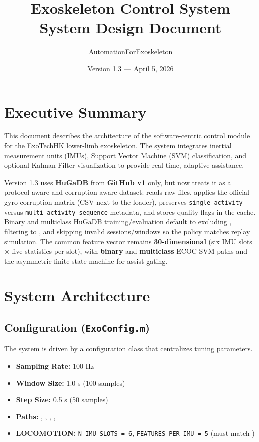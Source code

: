 \documentclass[11pt,a4paper]{article}
\title{Exoskeleton Control System\\[0.35em]\large System Design Document}
\author{AutomationForExoskeleton}
\date{Version 1.3 --- April 5, 2026}
\begin{document}
\maketitle

\section{Executive Summary}
This document describes the architecture of the software-centric control module for the ExoTechHK lower-limb exoskeleton. The system integrates inertial measurement units (IMUs), Support Vector Machine (SVM) classification, and optional Kalman Filter visualization to provide real-time, adaptive assistance.

Version 1.3 uses \textbf{HuGaDB} from \textbf{GitHub v1} only, but now treats it as a protocol-aware and corruption-aware dataset:  reads raw  files, applies the official gyro corruption matrix (CSV next to the loader), preserves \texttt{single\_activity} versus \texttt{multi\_activity\_sequence} metadata, and stores quality flags in the cache. Binary and multiclass HuGaDB training/evaluation default to excluding , filtering to , and skipping invalid sessions/windows so the policy matches replay simulation. The common feature vector remains \textbf{30-dimensional} (six IMU slots $\times$ five statistics per slot), with \textbf{binary} and \textbf{multiclass} ECOC SVM paths and the asymmetric finite state machine for assist gating.

\section{System Architecture}

\subsection{Configuration (\texttt{ExoConfig.m})}
The system is driven by a configuration class that centralizes tuning parameters.
\begin{itemize}
  \item \textbf{Sampling Rate:} 100 Hz
  \item \textbf{Window Size:} 1.0 s (100 samples)
  \item \textbf{Step Size:} 0.5 s (50 samples)
  \item \textbf{Paths:} , , , , 
  \item \textbf{LOCOMOTION:} \texttt{N\_IMU\_SLOTS = 6}, \texttt{FEATURES\_PER\_IMU = 5} (must match )
\end{itemize}
\end{document}
